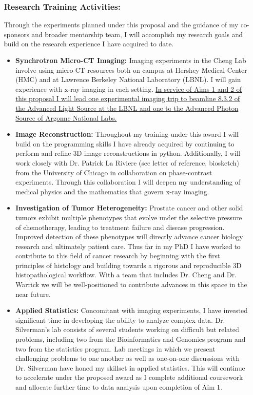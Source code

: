 \documentclass{NIHGrant}
\begin{document}
\subsubsection*{Research Training Activities:}
Through the experiments planned under this proposal and the guidance of my co-sponsors and broader mentorship team, I will accomplish my research goals and build on the research experience I have acquired to date.
\begin{itemize}[leftmargin=*, nosep]
  \item \textbf{Synchrotron Micro-CT Imaging:} Imaging experiments in the Cheng Lab involve using micro-CT resources both on campus at Hershey Medical Center (HMC) and at Lawrence Berkeley National Laboratory (LBNL). I will gain experience with x-ray imaging in each setting. \uline{In service of Aims 1 and 2 of this proposal I will lead one experimental imaging trip to beamline 8.3.2 of the Advanced Light Source at the LBNL and one to the Advanced Photon Source of Argonne National Labs.}
  \item \textbf{Image Reconstruction:} Throughout my training under this award I will build on the programming skills I have already acquired by continuing to perform and refine 3D image reconstructions in python. Additionally, I will work closely with Dr. Patrick La Riviere (see letter of reference, biosketch) from the University of Chicago in collaboration on phase-contrast experiments. Through this collaboration I will deepen my understanding of medical physics and the mathematics that govern x-ray imaging.
  \item \textbf{Investigation of Tumor Heterogeneity:} Prostate cancer and other solid tumors exhibit multiple phenotypes that evolve under the selective pressure of chemotherapy, leading to treatment failure and disease progression. Improved detection of these phenotypes will directly advance cancer biology research and ultimately patient care. Thus far in my PhD I have worked to contribute to this field of cancer research by beginning with the first principles of histology and building towards a rigorous and reproducible 3D histopathological workflow. With a team that includes Dr. Cheng and Dr. Warrick we will be well-positioned to contribute advances in this space in the near future.%
  \item \textbf{Applied Statistics:} Concomitant with imaging experiments, I have invested significant time in developing the ability to analyze complex data. Dr. Silverman's lab consists of several students working on difficult but related problems, including two from the Bioinformatics and Genomics program and two from the statistics program. Lab meetings in which we present challenging problems to one another as well as one-on-one discussions with Dr. Silverman have honed my skillset in applied statistics. This will continue to accelerate under the proposed award as I complete additional coursework and allocate further time to data analysis upon completion of Aim 1.

\end{itemize}
\end{document}
